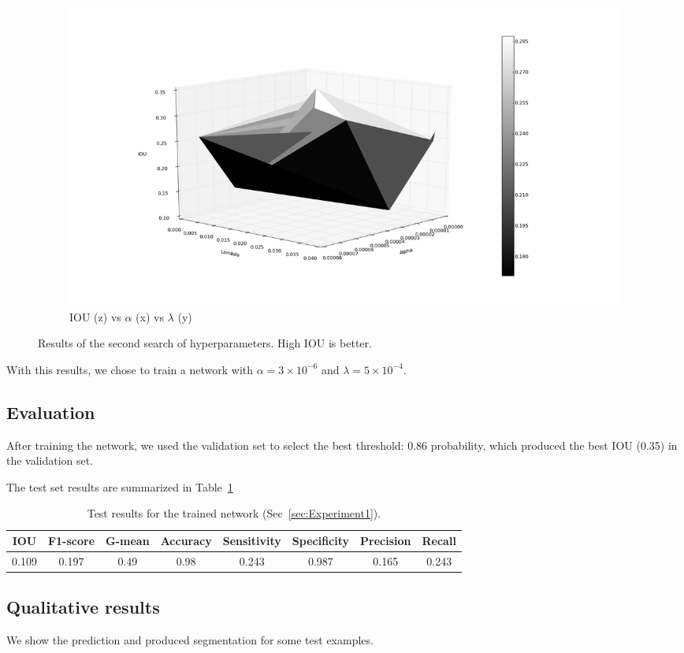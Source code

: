 \begin{figure}[h]
	\begin{subfigure}{0.32\textwidth}
		\centering
                \includegraphics[width=\textwidth]{plots/hs2_trisurface.png}
         \caption{IOU (z) vs $\alpha$ (x) vs $\lambda$ (y)}
	\end{subfigure}
	\caption[Second hyperparameter search for Experiment 1]{Results of the second search of hyperparameters. High IOU is better.}
	 \label{fig:Hs2}
\end{figure}

With this results, we chose to train a network with $\alpha = 3 \times 10^{-6}$ and $\lambda = 5 \times 10^{-4}$.

\subsection{Evaluation}
After training the network, we used the validation set to select the best threshold: 0.86 probability, which produced the best IOU (0.35) in the validation set.

The test set results are summarized in Table~\ref{tab:Results1}
\begin{table}[h]
	\centering
	\begin{tabular}{cccccccc}
	\hline
	\textbf{IOU}	& \textbf{F1-score}	& \textbf{G-mean} &\textbf{Accuracy}	& \textbf{Sensitivity} & \textbf{Specificity} & \textbf{Precision} & \textbf{Recall}\\
	\hline
	0.109 & 0.197 & 0.49 & 0.98 & 0.243 & 0.987 & 0.165 & 0.243 \\
	\hline
	\end{tabular}
	\caption[Results for Experiment 1]{Test results for the trained network (Sec~\ref{sec:Experiment1}).}
	\label{tab:Results1}
\end{table}

\subsection{Qualitative results}
We show the prediction and produced segmentation for some test examples.%

